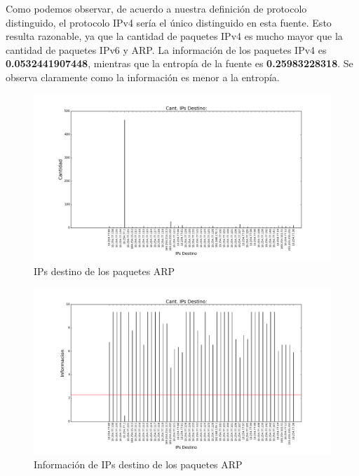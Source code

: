 Como podemos observar, de acuerdo a nuestra definición de protocolo distinguido, el protocolo IPv4 sería el único distinguido en esta fuente. Esto resulta razonable, ya que la cantidad de paquetes IPv4 es mucho mayor que la cantidad de paquetes IPv6 y ARP. La información de los paquetes IPv4 es \textbf{0.0532441907448}, mientras que la entropía de la fuente es \textbf{0.25983228318}. Se observa claramente como la información es menor a la entropía.

\begin{figure}[H]
       \centering
       \includegraphics[width=1\textwidth]{../resultados/Starbucks/histogram_dst.png}
       \caption{IPs destino de los paquetes ARP}
       \label{red-Starbucks-dst}
\end{figure}


\begin{figure}[H]
       \centering
       \includegraphics[width=1\textwidth]{../resultados/Starbucks/histogram_dst_information.png}
       \caption{Información de IPs destino de los paquetes ARP}
       \label{red-Starbucks-dst-information}
\end{figure}


